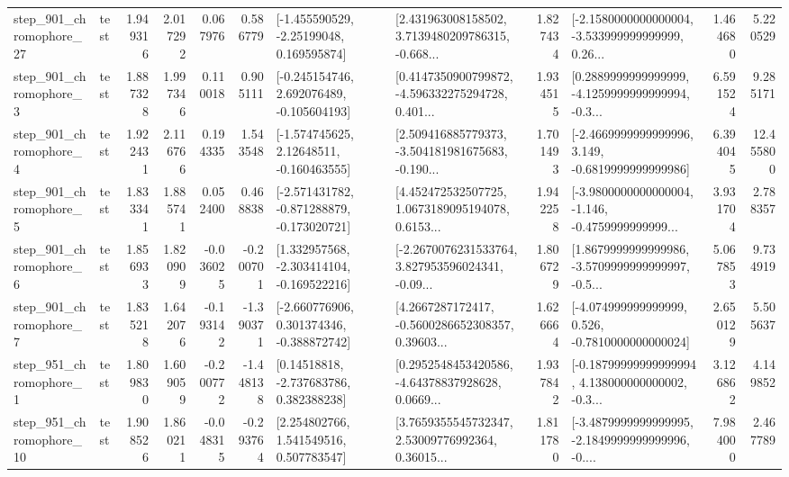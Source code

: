 \begin{tabular}{llrrrrllrlrr}
  step\_901\_chromophore\_27 &      test &      1.949316 &    2.017292 &      0.067976 &  0.586779 &    [-1.455590529, -2.25199048, 0.169595874] &  [2.431963008158502, 3.7139480209786315, -0.668... &       1.827434 &  [-2.1580000000000004, -3.533999999999999, 0.26... &            1.464680 &          5.220529 \\
   step\_901\_chromophore\_3 &      test &      1.887328 &    1.997346 &      0.110018 &  0.905111 &   [-0.245154746, 2.692076489, -0.105604193] &  [0.4147350900799872, -4.596332275294728, 0.401... &       1.934515 &  [0.2889999999999999, -4.1259999999999994, -0.3... &            6.591524 &          9.285171 \\
   step\_901\_chromophore\_4 &      test &      1.922431 &    2.116766 &      0.194335 &  1.543548 &    [-1.574745625, 2.12648511, -0.160463555] &  [2.509416885779373, -3.504181981675683, -0.190... &       1.701493 &  [-2.4669999999999996, 3.149, -0.6819999999999986] &            6.394045 &         12.455800 \\
   step\_901\_chromophore\_5 &      test &      1.833341 &    1.885741 &      0.052400 &  0.468838 &  [-2.571431782, -0.871288879, -0.173020721] &  [4.452472532507725, 1.0673189095194078, 0.6153... &       1.942258 &  [-3.9800000000000004, -1.146, -0.4759999999999... &            3.931704 &          2.788357 \\
   step\_901\_chromophore\_6 &      test &      1.856933 &    1.820909 &     -0.036025 & -0.200701 &   [1.332957568, -2.303414104, -0.169522216] &  [-2.2670076231533764, 3.827953596024341, -0.09... &       1.806729 &  [1.8679999999999986, -3.5709999999999997, -0.5... &            5.067853 &          9.734919 \\
   step\_901\_chromophore\_7 &      test &      1.835218 &    1.642076 &     -0.193142 & -1.390371 &   [-2.660776906, 0.301374346, -0.388872742] &  [4.2667287172417, -0.5600286652308357, 0.39603... &       1.626664 &   [-4.074999999999999, 0.526, -0.7810000000000024] &            2.650129 &          5.505637 \\
   step\_951\_chromophore\_1 &      test &      1.809830 &    1.609059 &     -0.200772 & -1.448138 &     [0.14518818, -2.737683786, 0.382388238] &  [0.2952548453420586, -4.64378837928628, 0.0669... &       1.937842 &  [-0.18799999999999994, 4.138000000000002, -0.3... &            3.126862 &          4.149852 \\
  step\_951\_chromophore\_10 &      test &      1.908526 &    1.860211 &     -0.048315 & -0.293764 &     [2.254802766, 1.541549516, 0.507783547] &  [3.7659355545732347, 2.53009776992364, 0.36015... &       1.811780 &  [-3.4879999999999995, -2.1849999999999996, -0.... &            7.984000 &          2.467789 \\

\end{tabular}
